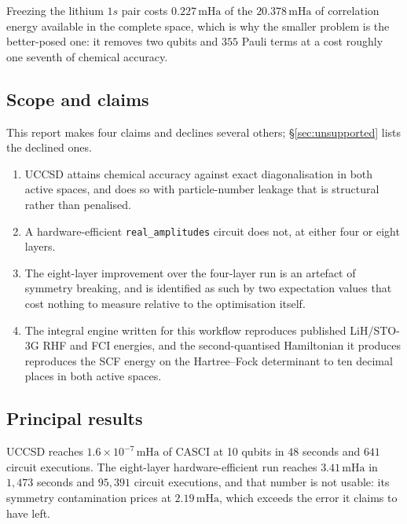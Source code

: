 \documentclass[11pt,a4paper]{article}
\newcommand{\mHa}{\ensuremath{\,\mathrm{mHa}}}
\newcommand{\code}[1]{\texttt{\small #1}}
\begin{document}
Freezing the lithium $1s$ pair costs $0.227\mHa$ of the $20.378\mHa$ of
correlation energy available in the complete space, which is why the smaller
problem is the better-posed one: it removes two qubits and $355$ Pauli terms at
a cost roughly one seventh of chemical accuracy.

\subsection{Scope and claims}

This report makes four claims and declines several others; \S\ref{sec:unsupported}
lists the declined ones.

\begin{enumerate}[leftmargin=1.4em,itemsep=0.15em]
\item UCCSD attains chemical accuracy against exact diagonalisation in both
  active spaces, and does so with particle-number leakage that is
  structural rather than penalised.
\item A hardware-efficient \code{real\_amplitudes} circuit does not, at either
  four or eight layers.
\item The eight-layer improvement over the four-layer run is an artefact of
  symmetry breaking, and is identified as such by two expectation values that
  cost nothing to measure relative to the optimisation itself.
\item The integral engine written for this workflow reproduces published
  LiH/STO-3G RHF and FCI energies, and the second-quantised Hamiltonian it
  produces reproduces the SCF energy on the Hartree--Fock determinant to ten
  decimal places in both active spaces.
\end{enumerate}

\subsection{Principal results}

\begin{result}[Headline]
UCCSD reaches $1.6\times10^{-7}\mHa$ of CASCI at 10 qubits in $48$ seconds and
$641$ circuit executions. The eight-layer hardware-efficient run reaches
$3.41\mHa$ in $1{,}473$ seconds and $95{,}391$ circuit executions, and that
number is not usable: its symmetry contamination prices at $2.19\mHa$, which
exceeds the error it claims to have left.
\end{result}

\end{document}
